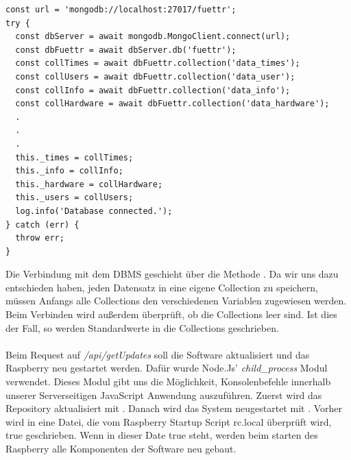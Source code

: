 \begin{lstlisting}[caption=Verbindung mit der Datenbank,style=TS,label=database-connection]
const url = 'mongodb://localhost:27017/fuettr';
try {
  const dbServer = await mongodb.MongoClient.connect(url);
  const dbFuettr = await dbServer.db('fuettr');
  const collTimes = await dbFuettr.collection('data_times');
  const collUsers = await dbFuettr.collection('data_user');
  const collInfo = await dbFuettr.collection('data_info');
  const collHardware = await dbFuettr.collection('data_hardware');
  .
  .
  .
  this._times = collTimes;
  this._info = collInfo;
  this._hardware = collHardware;
  this._users = collUsers;
  log.info('Database connected.');
} catch (err) {
  throw err;
}
\end{lstlisting}

Die Verbindung mit dem \ac{DBMS} geschieht über die Methode . Da wir uns dazu entschieden haben, jeden Datensatz in eine eigene Collection zu speichern, müssen Anfangs alle Collections den verschiedenen Variablen zugewiesen werden. Beim Verbinden wird außerdem überprüft, ob die Collections leer sind. Ist dies der Fall, so werden Standardwerte in die Collections geschrieben. \\\\

Beim Request auf \textit{/api/getUpdates} soll die Software aktualisiert und das Raspberry neu gestartet werden. Dafür wurde Node.Js' \textit{child\_process} Modul verwendet. Dieses Modul gibt uns die Möglichkeit, Konsolenbefehle innerhalb unserer Serverseitigen JavaScript Anwendung auszuführen. Zuerst wird das Repository aktualisiert mit . Danach wird das System neugestartet mit . Vorher wird in eine Datei, die vom Raspberry Startup Script rc.local überprüft wird, true geschrieben. Wenn in dieser Date true steht, werden beim starten des Raspberry alle Komponenten der Software neu gebaut.


